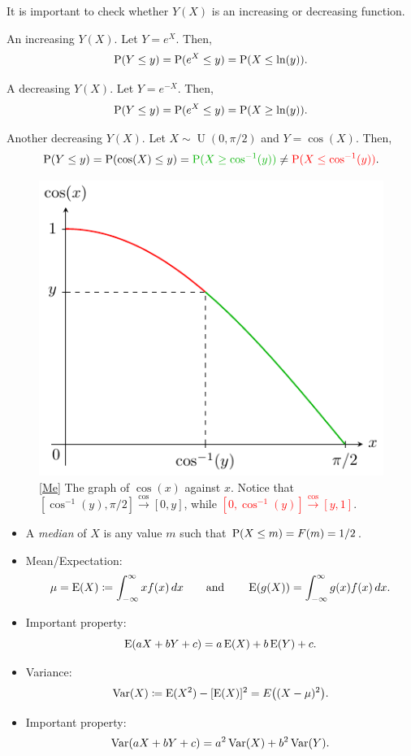 \begin{note}
  It is important to check whether \(Y(X)\) is an increasing or decreasing function.
\end{note}
\begin{example}{An increasing \(Y(X)\).}{}
  Let \(Y=e^X\). Then,
  \[\operatorname{P}(Y\leq y)=\operatorname{P}(e^X\leq y)=\operatorname{P}(X\leq\ln(y)).\]
\end{example}
\begin{example}{A decreasing \(Y(X)\).}{}
  Let \(Y=e^{-X}\). Then,
  \[\operatorname{P}(Y\leq y)=\operatorname{P}(e^X\leq y)=\operatorname{P}(X\geq\ln(y)).\]
\end{example}
\begin{example}{Another decreasing \(Y(X)\).}{}
  Let \(X\sim\operatorname{U}(0,\pi/2)\) and \(Y=\cos(X)\). Then, 
  \[\Prob(Y\leq y)=\Prob(\cos(X)\leq y)=\textcolor{green!70!black}{\Prob(X\geq\cos^{-1}(y))}\neq \textcolor{red}{\Prob(X\leq\cos^{-1}(y))}.\]
  \begin{figure}[H]
    \centering
    \includegraphics{Diagrams/CRV-cosine/diagram.pdf}
    \caption{\ref{Me} The graph of \(\cos(x)\) against \(x\). Notice that \textcolor{green!70!black}{\([\cos^{-1}(y),\pi/2]\stackrel{\cos}{\to}[0,y]\)}, while \textcolor{red}{\([0,\cos^{-1}(y)]\stackrel{\cos}{\to}[y,1]\)}.}
    \label{fig:CRV-cosine}
  \end{figure}
\end{example}
\begin{stbox}{}
  \begin{itemize}
    \item A \emph{median} of \(X\) is any value \(m\) such that \(\operatorname{P}(X\leq m)=F(m)=1/2\).
    \item Mean/Expectation: 
    \[\mu=\operatorname{E}(X)\coloneq \int_{-\infty}^{\infty}xf(x)\,dx \qquad\text{and}\qquad \operatorname{E}(g(X))=\int_{-\infty}^{\infty}g(x)f(x)\,dx.\]
    \item Important property: 
    \[\operatorname{E}(aX+bY+c)=a\operatorname{E}(X)+b\operatorname{E}(Y)+c.\]
    \item Variance: 
    \[\operatorname{Var}(X)\coloneq \operatorname{E}(X^2)-[\operatorname{E}(X)]^2=E{\left((X-\mu)^2\right)}.\]
    \item Important property:
    \[\operatorname{Var}(aX+bY+c)=a^2\operatorname{Var}(X)+b^2\operatorname{Var}(Y).\]
  \end{itemize}
\end{stbox}

